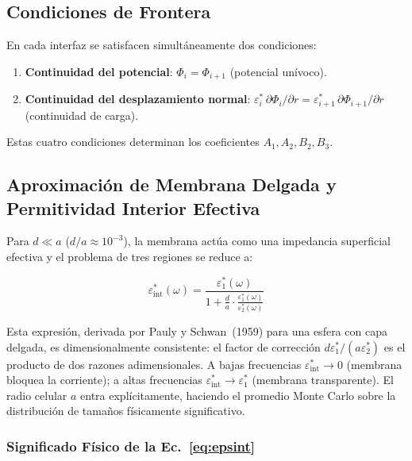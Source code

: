 \documentclass[12pt]{article}
\begin{document}
\subsection{Condiciones de Frontera}

En cada interfaz se satisfacen simult\'aneamente dos condiciones:

\begin{enumerate}
\item \textbf{Continuidad del potencial}: $\Phi_i = \Phi_{i+1}$ (potencial un\'ivoco).
\item \textbf{Continuidad del desplazamiento normal}:
$\varepsilon_i^*\,\partial\Phi_i/\partial r =
\varepsilon_{i+1}^*\,\partial\Phi_{i+1}/\partial r$ (continuidad de carga).
\end{enumerate}

Estas cuatro condiciones determinan los coeficientes $A_1, A_2, B_2, B_3$.

\subsection{Aproximaci\'on de Membrana Delgada y Permitividad Interior Efectiva}

Para $d \ll a$ ($d/a \approx 10^{-3}$), la membrana act\'ua como una impedancia superficial
efectiva y el problema de tres regiones se reduce a:

\begin{equation}
\boxed{
\varepsilon_{\text{int}}^*(\omega) =
\frac{\varepsilon_1^*(\omega)}{\displaystyle
1 + \frac{d}{a}\cdot\frac{\varepsilon_1^*(\omega)}{\varepsilon_2^*(\omega)}}
}
\label{eq:epsint}
\end{equation}

\noindent Esta expresi\'on, derivada por Pauly y Schwan~(1959) para una esfera
con capa delgada, es dimensionalmente consistente: el factor de correcci\'on
$d\varepsilon_1^*/(a\varepsilon_2^*)$ es el producto de dos razones
adimensionales.
A bajas frecuencias $\varepsilon_{\mathrm{int}}^*\!\to\!0$ (membrana
bloquea la corriente); a altas frecuencias
$\varepsilon_{\mathrm{int}}^*\!\to\!\varepsilon_1^*$ (membrana transparente).
El radio celular $a$ entra expl\'icitamente, haciendo el promedio Monte Carlo
sobre la distribuci\'on de tama\~nos f\'isicamente significativo.

\subsubsection{Significado F\'isico de la Ec.~\eqref{eq:epsint}}
\end{document}
